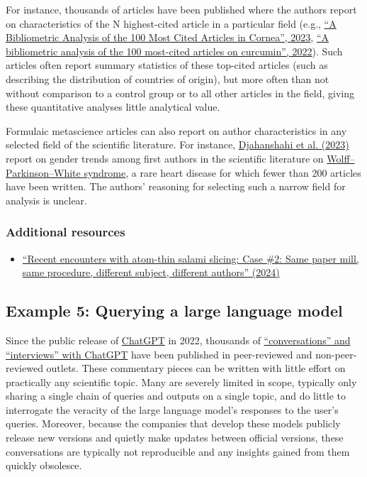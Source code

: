 \documentclass[letterpaper, 12pt]{article}
\begin{document}
For instance, thousands of articles have been published where the authors report on characteristics of the N highest-cited article in a particular field (e.g., \href{https://doi.org/10.1097/coa.0000000000000021}{``A Bibliometric Analysis of the 100 Most Cited Articles in Cornea'', 2023}, \href{https://doi.org/10.3389/fphar.2022.963032}{``A bibliometric analysis of the 100 most-cited articles on curcumin'', 2022}). Such articles often report summary statistics of these top-cited articles (such as describing the distribution of countries of origin), but more often than not without comparison to a control group or to all other articles in the field, giving these quantitative analyses little analytical value.

Formulaic metascience articles can also report on author characteristics in any selected field of the scientific literature. For instance, \href{https://doi.org/10.7759/cureus.47208}{Djahanshahi et al. (2023)} report on gender trends among first authors in the scientific literature on \href{https://en.wikipedia.org/wiki/Wolff%E2%80%93Parkinson%E2%80%93White\_syndrome}{Wolff–Parkinson–White syndrome}, a rare heart disease for which fewer than 200 articles have been written. The authors' reasoning for selecting such a narrow field for analysis is unclear.

\subsubsection*{Additional resources}

\begin{itemize}
    \setlength\itemsep{-0.5em}
    \item \href{https://reeserichardson.blog/2024/12/30/recent-encounters-with-atom-thin-salami-slicing/}{``Recent encounters with atom-thin salami slicing: Case \#2: Same paper mill, same procedure, different subject, different authors'' (2024)}
\end{itemize}

\subsection*{Example 5: Querying a large language model}

Since the public release of \href{https://en.wikipedia.org/wiki/ChatGPT}{ChatGPT} in 2022, thousands of \href{https://scholar.google.com/scholar?start=10&q="conversation+with+chatgpt"+OR+"interview+with+chatgpt"&hl=en}{``conversations'' and ``interviews'' with ChatGPT} have been published in peer-reviewed and non-peer-reviewed outlets. These commentary pieces can be written with little effort on practically any scientific topic. Many are severely limited in scope, typically only sharing a single chain of queries and outputs on a single topic, and do little to interrogate the veracity of the large language model's responses to the user's queries. Moreover, because the companies that develop these models publicly release new versions and quietly make updates between official versions, these conversations are typically not reproducible and any insights gained from them quickly obsolesce.
\end{document}
